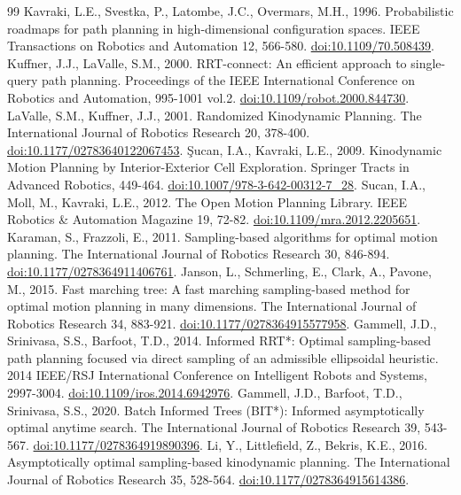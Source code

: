 \begin{thebibliography}{99}
 Kavraki, L.E., Svestka, P., Latombe, J.C., Overmars, M.H., 1996. Probabilistic roadmaps for path planning in high-dimensional configuration spaces. IEEE Transactions on Robotics and Automation 12, 566-580. \href{https://doi.org/10.1109/70.508439}{doi:10.1109/70.508439}.
 Kuffner, J.J., LaValle, S.M., 2000. RRT-connect: An efficient approach to single-query path planning. Proceedings of the IEEE International Conference on Robotics and Automation, 995-1001 vol.2. \href{https://doi.org/10.1109/robot.2000.844730}{doi:10.1109/robot.2000.844730}.
 LaValle, S.M., Kuffner, J.J., 2001. Randomized Kinodynamic Planning. The International Journal of Robotics Research 20, 378-400. \href{https://doi.org/10.1177/02783640122067453}{doi:10.1177/02783640122067453}.
 \c{S}ucan, I.A., Kavraki, L.E., 2009. Kinodynamic Motion Planning by Interior-Exterior Cell Exploration. Springer Tracts in Advanced Robotics, 449-464. \href{https://doi.org/10.1007/978-3-642-00312-7_28}{doi:10.1007/978-3-642-00312-7\_28}.
 Sucan, I.A., Moll, M., Kavraki, L.E., 2012. The Open Motion Planning Library. IEEE Robotics \& Automation Magazine 19, 72-82. \href{https://doi.org/10.1109/mra.2012.2205651}{doi:10.1109/mra.2012.2205651}.
 Karaman, S., Frazzoli, E., 2011. Sampling-based algorithms for optimal motion planning. The International Journal of Robotics Research 30, 846-894. \href{https://doi.org/10.1177/0278364911406761}{doi:10.1177/0278364911406761}.
 Janson, L., Schmerling, E., Clark, A., Pavone, M., 2015. Fast marching tree: A fast marching sampling-based method for optimal motion planning in many dimensions. The International Journal of Robotics Research 34, 883-921. \href{https://doi.org/10.1177/0278364915577958}{doi:10.1177/0278364915577958}.
 Gammell, J.D., Srinivasa, S.S., Barfoot, T.D., 2014. Informed RRT*: Optimal sampling-based path planning focused via direct sampling of an admissible ellipsoidal heuristic. 2014 IEEE/RSJ International Conference on Intelligent Robots and Systems, 2997-3004. \href{https://doi.org/10.1109/iros.2014.6942976}{doi:10.1109/iros.2014.6942976}.
 Gammell, J.D., Barfoot, T.D., Srinivasa, S.S., 2020. Batch Informed Trees (BIT*): Informed asymptotically optimal anytime search. The International Journal of Robotics Research 39, 543-567. \href{https://doi.org/10.1177/0278364919890396}{doi:10.1177/0278364919890396}.
 Li, Y., Littlefield, Z., Bekris, K.E., 2016. Asymptotically optimal sampling-based kinodynamic planning. The International Journal of Robotics Research 35, 528-564. \href{https://doi.org/10.1177/0278364915614386}{doi:10.1177/0278364915614386}.

\end{thebibliography}
